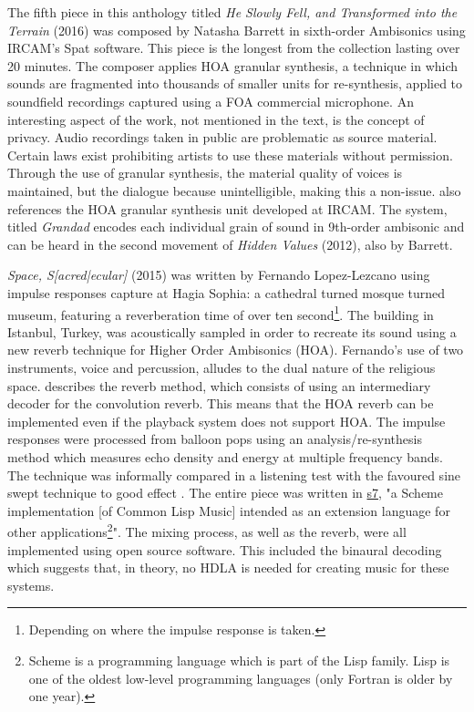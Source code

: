 The fifth piece in this anthology titled \textit{He Slowly Fell, and Transformed into the Terrain} (2016) was composed by Natasha Barrett in sixth-order Ambisonics using IRCAM's Spat software. This piece is the longest from the collection lasting over 20 minutes. The composer applies HOA granular synthesis, a technique in which sounds are fragmented into thousands of smaller units for re-synthesis, applied to soundfield recordings captured using a FOA commercial microphone. An interesting aspect of the work, not mentioned in the text, is the concept of privacy. Audio recordings taken in public are problematic as source material. Certain laws exist prohibiting artists to use these materials without permission. Through the use of granular synthesis, the material quality of voices is maintained, but the dialogue because unintelligible, making this a non-issue. \cite{barrett2016musical} also references the HOA granular synthesis unit developed at IRCAM. The system, titled \textit{Grandad} encodes each individual grain of sound in 9th-order ambisonic and can be heard in the second movement of \textit{Hidden Values} (2012), also by Barrett. 

\textit{Space, S[acred|ecular]} (2015) was written by Fernando Lopez-Lezcano using impulse responses capture at Hagia Sophia: a cathedral turned mosque turned museum, featuring a reverberation time of over ten second\footnote{Depending on where the impulse response is taken.}. The building in Istanbul, Turkey, was acoustically sampled in order to recreate its sound using a new reverb technique for Higher Order Ambisonics (HOA). Fernando's use of two instruments, voice and percussion, alludes to the dual nature of the religious space.  \cite{lopez2014architecture} describes the reverb method, which consists of using an intermediary decoder for the convolution reverb. This means that the HOA reverb can be implemented even if the playback system does not support HOA. The impulse responses were processed from balloon pops using an analysis/re-synthesis method which measures echo density and energy at multiple frequency bands. The technique was informally compared in a listening test with the favoured sine swept technique to good effect \cite{abel2010estimating}. The entire piece was written in \href{https://ccrma.stanford.edu/software/snd/snd/s7.html#juce}{s7}, "a Scheme implementation [of Common Lisp Music] intended as an extension language for other applications\footnote{Scheme is a programming language which is part of the Lisp family. Lisp is one of the oldest low-level programming languages (only Fortran is older by one year).}". The mixing process, as well as the reverb, were all implemented using open source software. This included the binaural decoding which suggests that, in theory, no HDLA is needed for creating music for these systems. 


